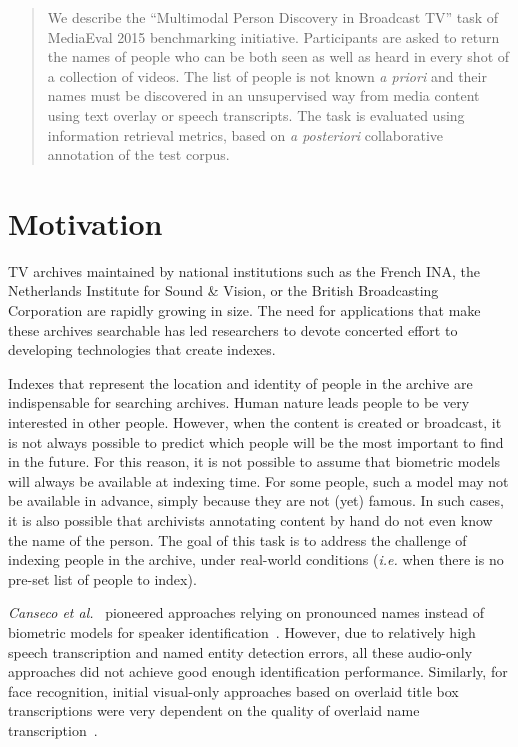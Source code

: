 \documentclass{acm_proc_article-me}
\begin{document}
\maketitle
\begin{abstract}
We describe the ``Multimodal Person Discovery in Broadcast TV'' task of MediaEval 2015 benchmarking initiative. Participants are asked to return the names of people who can be both seen as well as heard in every shot of a collection of videos. The list of people is not known \emph{a priori} and their names must be discovered in an unsupervised way from media content using text overlay or speech transcripts. The task is evaluated using information retrieval metrics, based on \emph{a posteriori} collaborative annotation of the test corpus.
\end{abstract}

\section{Motivation}

TV archives maintained by national institutions such as the French INA, the Netherlands Institute for Sound \& Vision, or the British Broadcasting Corporation are rapidly growing in size. The need for applications that make these archives searchable has led researchers to devote concerted effort to developing technologies that create indexes.

Indexes that represent the location and identity of people in the archive are indispensable for searching archives. Human nature leads people to be very interested in other people. However, when the content is created or broadcast, it is not always possible to predict which people will be the most important to find in the future.
For this reason, it is not possible to assume that biometric models will always be available at indexing time. For some people, such a model may not be available in advance, simply because they are not (yet) famous. In such cases, it is also possible that archivists annotating content by hand do not even know the name of the person. The goal of this task is to address the challenge of indexing people in the archive, under real-world conditions (\emph{i.e.} when there is no pre-set list of people to index).

\textit{Canseco et al.}~\cite{CANSECO--ASRU--2005, CANSECO--INTERSPEECH--2004} pioneered approaches relying on pronounced names instead of biometric models for speaker identification~\cite{ESTEVE--INTERSPEECH--2007, JOUSSE--ICCASP--2009, MAUCLAIR--Odyssey--2006, TRANTER--ICASSP--2006}. However, due to relatively high speech transcription and named entity detection errors, all these audio-only approaches did not achieve good enough identification performance. Similarly, for face recognition, initial visual-only approaches based on overlaid title box transcriptions were very dependent on the quality of overlaid name transcription~\cite{HOUGHTON--IS--1999, SATOH--IEEEMM--1999, YANG--ACMMM--2004, YANG--ACMMM--2005}.
\end{document}

